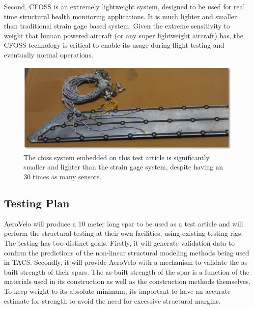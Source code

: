 \documentclass[]{aiaa-tc}
\begin{document}
        Second, CFOSS is an extremely lightweight system, designed to be used for real time structural health monitoring applications.
        It is much lighter and smaller than traditional strain gage based system. Given the extreme sensitivity to weight
        that human powered aircraft (or any super lightweight aircraft) has, the CFOSS technology is critical to enable its usage during 
        flight testing and eventually normal operations. 


        \begin{figure}[!hbt]
            \centering
            \includegraphics[width=.9\textwidth]{images/cfoss_vs_straingauge}
            \caption{The cfoss system embedded on this test article is significantly smaller and lighter than the strain gage system, 
            despite having an 30 times as many sensors. }
            \label{fig:cfoss-vs-straingauge}
        \end{figure}


        \subsection{Testing Plan}

        AeroVelo will produce a 10 meter long spar to be used as a test article and will perform the structural testing 
        at their own facilities, using existing testing rigs. The testing has 
        two distinct goals. Firstly, it will generate validation data to confirm the predictions 
        of the non-linear structural modeling methods being used in TACS. Secondly, it will provide AeroVelo with a mechanism 
        to validate the as-built strength of their spars. The as-built strength of the spar is a function of the materials used 
        in its construction as well as the construction methods themselves. To keep weight to its absolute minimum, 
        its important to have an accurate estimate for strength to avoid the need for excessive structural margins. 
\end{document}

